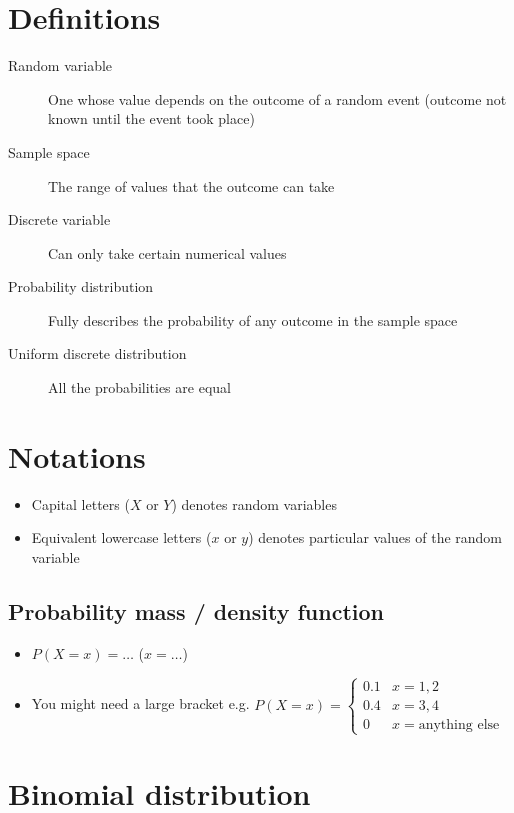 \documentclass[oneside,fleqn,11pt]{book}
\begin{document}
	\section{Definitions}
	\begin{description}
		\item[Random variable] One whose value depends on the outcome of a random event (outcome not known until the event took place)
		\item[Sample space] The range of values that the outcome can take
		\item[Discrete variable] Can only take certain numerical values
		\item[Probability distribution] Fully describes the probability of any outcome in the sample space
		\item[Uniform discrete distribution] All the probabilities are equal
	\end{description}
	
	\section{Notations}
	\begin{itemize}
		\item Capital letters ($X$ or $Y$) denotes random variables
		\item Equivalent lowercase letters ($x$ or $y$) denotes particular values of the random variable
	\end{itemize}
	
	\subsection{Probability mass / density function}
	\begin{itemize}
		\item $P(X=x) = \dots$ ($x=\dots$)
		\item You might need a large bracket e.g. \begin{math}
			P(X=x) = \begin{cases}
				0.1 & x=1, 2\\
				0.4 & x=3, 4\\
				0 & x=\text{anything else}
			\end{cases}  
		\end{math}
	\end{itemize}
	
	\section{Binomial distribution}
\end{document}
